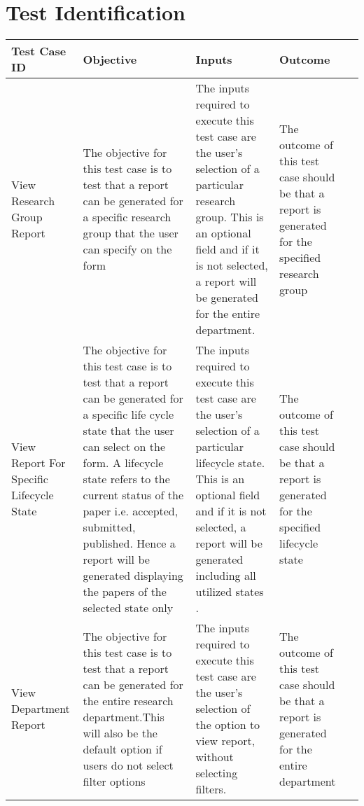 \section{Test Identification}
\label{sec:testId}
\hypertarget{label}{}

\begin{tabular}{ L{3cm}| L{3cm}| L{3cm}| L{3cm}| L{0cm}}
	\hline
	\textbf{Test Case ID} & \textbf{Objective} & \textbf{Inputs} & \textbf{Outcome}\\
	\hline
	\hline
	View Research Group Report  &
	The objective for this test case is to test that a report can be generated for a specific research group that the user can specify on the form &
	The inputs required to execute this test case are the user's selection of a particular research group. This is an optional field and if it is not selected, a report will be generated for the entire department. &
	The outcome of this test case should be that a report is generated for the specified research group & \\
	\hline
View Report For Specific Lifecycle State  &
	The objective for this test case is to test that a report can be generated for a specific life cycle state that the user can select on the form. A lifecycle state refers to the current status of the paper i.e. accepted, submitted, published. Hence a report will be generated displaying the papers of the selected state only &
	The inputs required to execute this test case are the user's selection of a particular lifecycle state. This is an optional field and if it is not selected, a report will be generated including all utilized states . &
	The outcome of this test case should be that a report is generated for the specified lifecycle state & \\
	\hline
View Department Report &
	The objective for this test case is to test that a report can be generated for the entire research department.This will also be the default option if users do not select filter options &
	The inputs required to execute this test case are the user's selection of the option to view report, without selecting filters. &
	The outcome of this test case should be that a report is generated for the entire department& \\
\end{tabular}
\\
